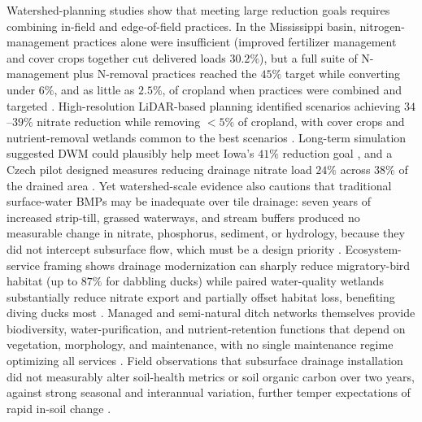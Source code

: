 Watershed-planning studies show that meeting large reduction goals requires
combining in-field and edge-of-field practices. In the Mississippi basin,
nitrogen-management practices alone were insufficient (improved fertilizer
management and cover crops together cut delivered loads $30.2\%$), but a
full suite of N-management plus N-removal practices reached the $45\%$
target while converting under $6\%$, and as little as $2.5\%$, of cropland
when practices were combined and targeted \parencite{McLellan2015}.
High-resolution LiDAR-based planning identified scenarios achieving
$34$--$39\%$ nitrate reduction while removing $<5\%$ of cropland, with cover
crops and nutrient-removal wetlands common to the best scenarios
\parencite{Tomer2015}. Long-term simulation suggested DWM could plausibly
help meet Iowa's $41\%$ reduction goal \parencite{Craft2018}, and a Czech
pilot designed measures reducing drainage nitrate load $24\%$ across $38\%$
of the drained area \parencite{Kvítek2023}. Yet watershed-scale evidence
also cautions that traditional surface-water BMPs may be inadequate over
tile drainage: seven years of increased strip-till, grassed waterways, and
stream buffers produced no measurable change in nitrate, phosphorus,
sediment, or hydrology, because they did not intercept subsurface flow,
which must be a design priority \parencite{Lemke2011}. Ecosystem-service
framing shows drainage modernization can sharply reduce migratory-bird
habitat (up to $87\%$ for dabbling ducks) while paired water-quality
wetlands substantially reduce nitrate export and partially offset habitat
loss, benefiting diving ducks most \parencite{Mitchell2022,Mitchell2025}.
Managed and semi-natural ditch networks themselves provide biodiversity,
water-purification, and nutrient-retention functions that depend on
vegetation, morphology, and maintenance, with no single maintenance regime
optimizing all services \parencite{Dollinger2015,Herzon2008}. Field
observations that subsurface drainage installation did not measurably alter
soil-health metrics or soil organic carbon over two years, against strong
seasonal and interannual variation, further temper expectations of rapid
in-soil change \parencite{Sherbine2023,Huang2023}.